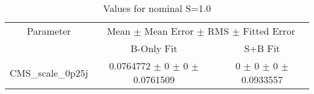 \begin{table}
\centering
\caption{Values for nominal S=1.0}
\begin{tabular}{ccc}
\toprule
Parameter 	& \multicolumn{2}{c}{Mean $\pm$ Mean Error $\pm$ RMS $\pm$ Fitted Error}\\
 	& B-Only Fit & S+B Fit\\
\midrule
CMS\_scale\_0p25j 	& \num{0.0764772} $\pm$ \num{0} $\pm$ \num{0} $\pm$ \num{0.0761509} 	& \num{0} $\pm$ \num{0} $\pm$ \num{0} $\pm$ \num{0.0933557}\\
\bottomrule
\end{tabular}
\end{table}